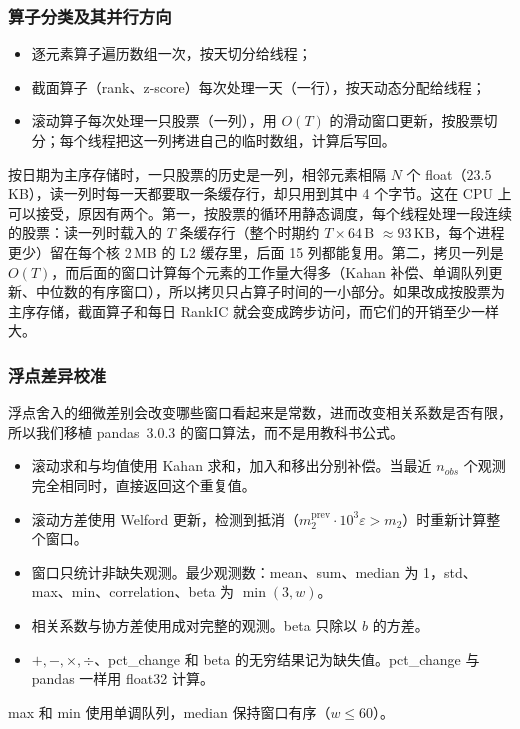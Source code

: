 \documentclass[11pt,a4paper,UTF8,fontset=fandol]{ctexart}
\begin{document}
\subsubsection{算子分类及其并行方向}
\label{sec:operators}
\begin{itemize}[nosep]
  \item 逐元素算子遍历数组一次，按天切分给线程；
  \item 截面算子（rank、z-score）每次处理一天（一行），按天动态分配给线程；
  \item 滚动算子每次处理一只股票（一列），用 $O(T)$ 的滑动窗口更新，按股票切分；每个线程把这一列拷进自己的临时数组，计算后写回。
\end{itemize}
按日期为主序存储时，一只股票的历史是一列，相邻元素相隔 $N$ 个 float（$23.5$\,KB），读一列时每一天都要取一条缓存行，却只用到其中 4 个字节。这在 CPU 上可以接受，原因有两个。第一，按股票的循环用静态调度，每个线程处理一段连续的股票：读一列时载入的 $T$ 条缓存行（整个时期约 $T\times64$\,B $\approx 93$\,KB，每个进程更少）留在每个核 2\,MB 的 L2 缓存里，后面 15 列都能复用。第二，拷贝一列是 $O(T)$，而后面的窗口计算每个元素的工作量大得多（Kahan 补偿、单调队列更新、中位数的有序窗口），所以拷贝只占算子时间的一小部分。如果改成按股票为主序存储，截面算子和每日 RankIC 就会变成跨步访问，而它们的开销至少一样大。

\subsubsection{浮点差异校准}
\label{sec:fpcal}
浮点舍入的细微差别会改变哪些窗口看起来是常数，进而改变相关系数是否有限，所以我们移植 pandas~3.0.3 的窗口算法，而不是用教科书公式。
\begin{itemize}[nosep]
  \item 滚动求和与均值使用 Kahan 求和，加入和移出分别补偿。当最近 $n_{obs}$ 个观测完全相同时，直接返回这个重复值。
  \item 滚动方差使用 Welford 更新，检测到抵消（$m_2^{\text{prev}}\cdot10^3\varepsilon > m_2$）时重新计算整个窗口。
  \item 窗口只统计非缺失观测。最少观测数：mean、sum、median 为 1，std、max、min、correlation、beta 为 $\min(3,w)$。
  \item 相关系数与协方差使用成对完整的观测。beta 只除以 $b$ 的方差。
  \item $+,-,\times,\div$、pct\_change 和 beta 的无穷结果记为缺失值。pct\_change 与 pandas 一样用 float32 计算。
\end{itemize}
max 和 min 使用单调队列，median 保持窗口有序（$w\le60$）。
\end{document}
